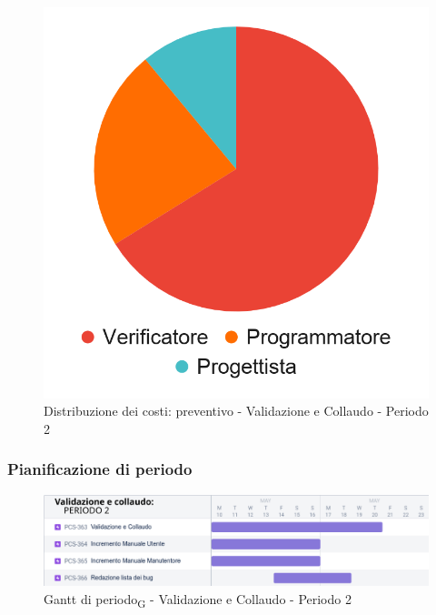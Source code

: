 \hspace{-1cm}
\begin{minipage}{.50\textwidth}
\smallPreventivoTable{
	
}
\end{minipage}
\hspace{1cm}
\begin{minipage}{.40\textwidth}
\begin{figure}[H]
	\includegraphics[scale=0.21]{res/images/charts/preventivo_priori/Grafico4-10.png}
	\caption{Distribuzione dei costi: preventivo - Validazione e Collaudo - Periodo 2}
\end{figure}
\end{minipage} 




\subsubsection{Pianificazione di periodo}


\begin{figure}[H]
	\centering
	\includegraphics[scale=0.55]{res/images/gantt_periodo/valid_2_gantt.png}
	\caption{Gantt di periodo\textsubscript{G} - Validazione e Collaudo - Periodo 2}
\end{figure}

